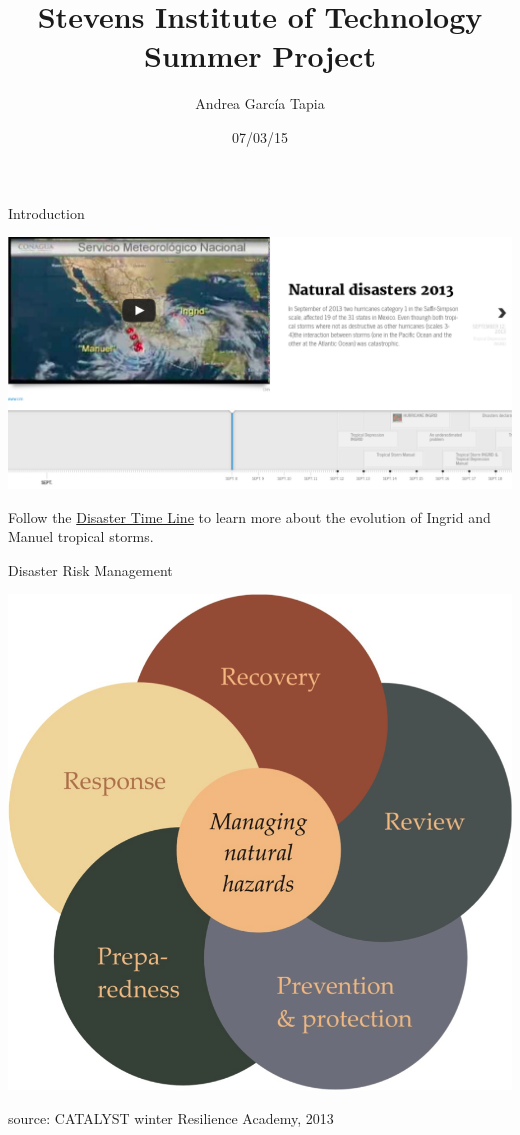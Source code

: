 \documentclass[ignorenonframetext,]{beamer}
\title{Stevens Institute of Technology Summer Project}
\author{Andrea García Tapia}
\date{07/03/15}
\begin{document}
\frame{\titlepage}

\begin{frame}{Introduction}

\includegraphics{img/timeline.png}

Follow the
\href{http://cdn.knightlab.com/libs/timeline/latest/embed/index.html?source=1wesPOVIPMQLbCplDyt5ENxd_H74QPUYk1GuBslD1mFY\&font=Merriweather-NewsCycle\&maptype=toner-lines\&lang=en\&height=650}{Disaster
Time Line} to learn more about the evolution of Ingrid and Manuel
tropical storms.

\end{frame}

\begin{frame}{Disaster Risk Management}

\includegraphics{img/rmc.png}

source: CATALYST winter Resilience Academy, 2013

\end{frame}
\end{document}

